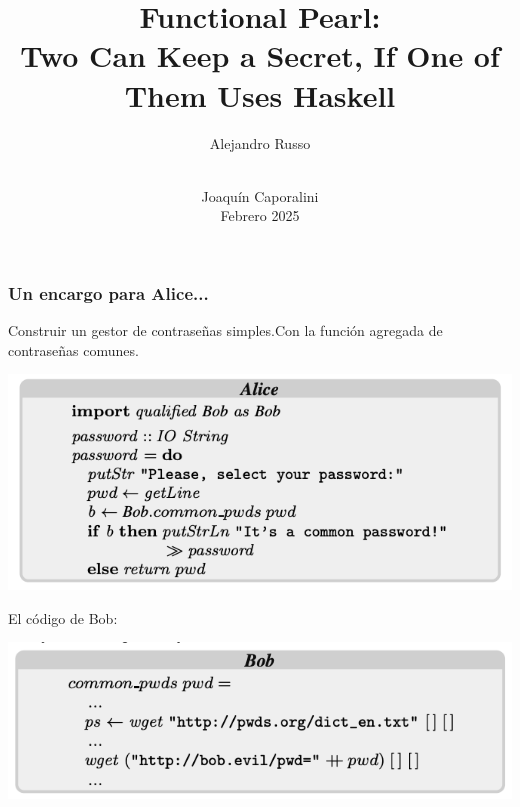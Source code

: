 \documentclass{beamer}
\title[Functional Pearl] %
{Functional Pearl: \\ Two Can Keep a Secret, If One of Them Uses Haskell}
\subtitle{
}
\author[Joaquin Caporalini] %
{
    Alejandro Russo
}
\institute[LCC - FCEIA] %
{
    Facultad de Ciencias Exactas, Ingeniería y Agrimensura\\Universidad Nacional de Rosario
}
\date[] %
{\textbf{} \\ Joaquín Caporalini\\Febrero 2025}
\begin{document}
\frame{
    \titlepage
}

        
        
    

\begin{frame}
    \frametitle{Un encargo para Alice...}
    Construir un gestor de contraseñas simples.\pause Con la función agregada de contraseñas comunes.
    \begin{center}
        \includegraphics[scale=0.65]{codigo_alice.png}
    \end{center}\pause
    El código de Bob:
    \begin{center}
        \includegraphics[scale=0.65]{codigo_bob.png}
    \end{center}
\end{frame}
\end{document}
